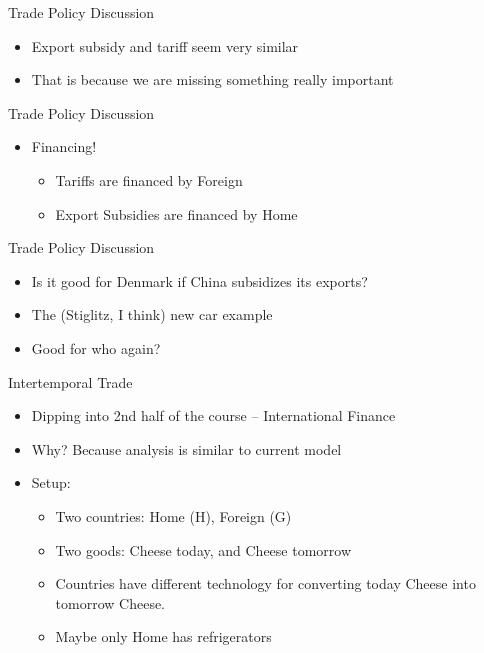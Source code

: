\documentclass[ignorenonframetext,]{beamer}
\begin{document}
\begin{frame}{Trade Policy Discussion}

    \begin{itemize}
        \item Export subsidy and tariff seem very similar
        \item That is because we are missing something really important \end{itemize}

\end{frame}

\begin{frame}{Trade Policy Discussion}

    \begin{itemize}
        \item Financing! 
        \begin{itemize}
            \item Tariffs are financed by Foreign
            \item Export Subsidies are financed by Home
        \end{itemize}
    \end{itemize}

\end{frame}

\begin{frame}{Trade Policy Discussion}

    \begin{itemize}
        \item Is it good for Denmark if China subsidizes its exports?
        \item The (Stiglitz, I think) new car example
        \item Good for who again?
    \end{itemize}

\end{frame}

\begin{frame}{Intertemporal Trade}

    \begin{itemize}
        \item Dipping into 2nd half of the course -- International Finance
        \item Why? Because analysis is similar to current model
        \item Setup:
        \begin{itemize}
            \item Two countries: Home (H), Foreign (G)
            \item Two goods: Cheese today, and Cheese tomorrow
            \item Countries have different technology for converting today Cheese into tomorrow Cheese.
            \item Maybe only Home has refrigerators
        \end{itemize}
    \end{itemize}
            
\end{frame}
\end{document}

